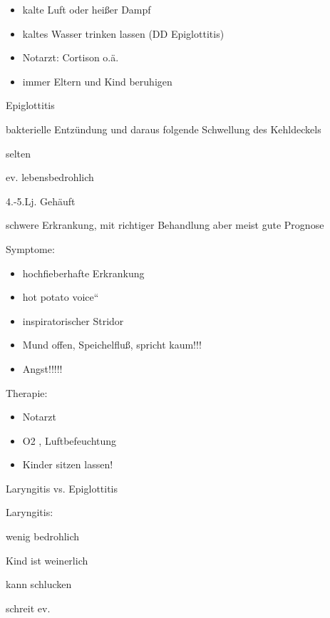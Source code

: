 \documentclass{article}
\begin{document}
\begin{itemize}
\item kalte  Luft oder hei{\ss}er  Dampf

\item kaltes Wasser trinken lassen (DD Epiglottitis)

\item Notarzt: Cortison o.\"a.

\item immer Eltern und  Kind beruhigen

\end{itemize}
Epiglottitis

bakterielle Entz\"undung und daraus  folgende Schwellung des Kehldeckels

selten

ev. lebensbedrohlich

4.-5.Lj. Geh\"auft

schwere Erkrankung, mit richtiger  Behandlung aber meist gute Prognose

Symptome:

\begin{itemize}
\item hochfieberhafte Erkrankung

\item {\quotedblbase}hot potato voice{\textquotedblleft}

\item inspiratorischer Stridor

\item Mund offen, Speichelflu{\ss}, spricht kaum!!!

\item Angst!!!!!

\end{itemize}
Therapie:

\begin{itemize}
\item Notarzt

\item O2 , Luftbefeuchtung

\item Kinder sitzen lassen!

\end{itemize}
Laryngitis vs. Epiglottitis

Laryngitis:

wenig bedrohlich

Kind ist weinerlich

kann schlucken

schreit ev.
\end{document}
